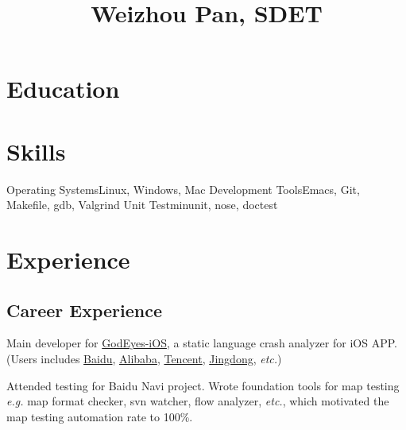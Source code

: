 \documentclass[11pt,a4paper,nolmodern]{moderncv}
\title{Weizhou Pan, SDET}
\begin{document}
\setmainfont{Minion Pro}
\setsansfont{Myriad Pro}

\maketitle

\section{\hei Education}



\section{Skills}

           {Operating Systems}{Linux, Windows, Mac}
           {Development Tools}{Emacs, Git, Makefile, gdb, Valgrind}
           {Unit Test}{minunit, nose, doctest}

\section{Experience}

\subsection{Career Experience}

{
\begin{tightitemize}%
 \item Main developer for \href{http://godeyes.duapp.com}{GodEyes-iOS}, a static
   language crash analyzer for iOS APP. (Users includes \href{http://www.baidu.com}{Baidu\texttrademark},
   \href{http://www.taobao.com}{Alibaba\texttrademark}, \href{http://www.qq.com}{Tencent\texttrademark}, \href{http://jd.com}{Jingdong\texttrademark}, \textsl{etc.})
 \item Attended testing for Baidu Navi project. Wrote foundation tools for
   map testing \textsl{e.g.} map format checker, svn
   watcher, flow analyzer, \textsl{etc.}, which motivated
   the map testing automation rate to 100\%.
 \end{tightitemize}}
\end{document}

